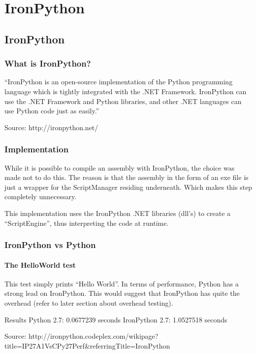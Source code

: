 \chapter{IronPython}

\section{IronPython}

\subsection{What is IronPython?}
``IronPython is an open-source implementation of the Python programming language which is tightly integrated with the .NET Framework. IronPython can use the .NET Framework and Python libraries, and other .NET languages can use Python code just as easily.''

Source: http://ironpython.net/


\subsection{Implementation}
While it is possible to compile an assembly with IronPython, the choice was made not to do this. The reason is that the assembly in the form of an exe file is just a wrapper for the ScriptManager residing underneath. Which makes this step completely unnecessary.

This implementation uses the IronPython .NET libraries (dll's) to create a ``ScriptEngine'', thus interpreting the code at runtime.


\subsection{IronPython vs Python}

\subsubsection{The HelloWorld test}
This test simply prints ``Hello World''. In terms of performance, Python has a strong lead on IronPython. This would suggest that IronPython has quite the overhead (refer to later section about overhead testing).

Results
Python 2.7: 0.0677239 seconds
IronPython 2.7: 1.0527518 seconds

Source: http://ironpython.codeplex.com/wikipage?title=IP27A1VsCPy27Perf&referringTitle=IronPython%


